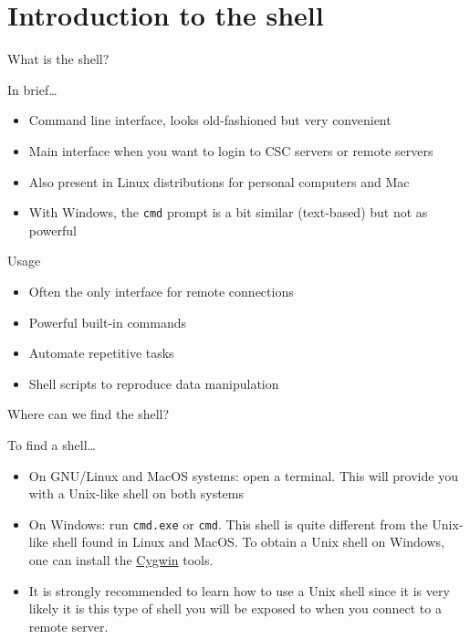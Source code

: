 \documentclass[big]{beamer}
\begin{document}
\section{Introduction to the shell}
\label{sec-2}

\begin{frame}[fragile,label=sec-2-1]{What is the shell?}
 \begin{block}{In brief\ldots{}}
\begin{itemize}
\item Command line interface, looks old-fashioned but very convenient
\item Main interface when you want to login to \alert{CSC servers} or \alert{remote servers}
\item Also present in \alert{Linux} distributions for personal computers and \alert{Mac}
\item With \alert{Windows}, the \texttt{cmd} prompt is a bit similar (text-based) but not as
powerful
\end{itemize}
\end{block}
\begin{block}{Usage}
\begin{itemize}
\item Often the only interface for remote connections
\item Powerful built-in commands
\item \alert{Automate repetitive tasks}
\item Shell scripts to \alert{reproduce} data manipulation
\end{itemize}
\end{block}
\end{frame}
\begin{frame}[fragile,label=sec-2-2]{Where can we find the shell?}
 \begin{block}{To find a shell\ldots{}}
\begin{itemize}
\item On \alert{GNU/Linux} and \alert{MacOS} systems: open a \alert{terminal}. This will provide you
with a Unix-like shell on both systems
\item On \alert{Windows}: run \texttt{cmd.exe} or \texttt{cmd}. This shell is quite different from the
Unix-like shell found in Linux and MacOS. To obtain a Unix shell on Windows,
one can install the \href{https://www.cygwin.com/}{Cygwin} tools.
\item It is strongly recommended to learn how to use a \alert{Unix shell} since it is
very likely it is this type of shell you will be exposed to when you connect
to a \alert{remote server}.
\end{itemize}
\end{block}
\end{frame}
\end{document}
